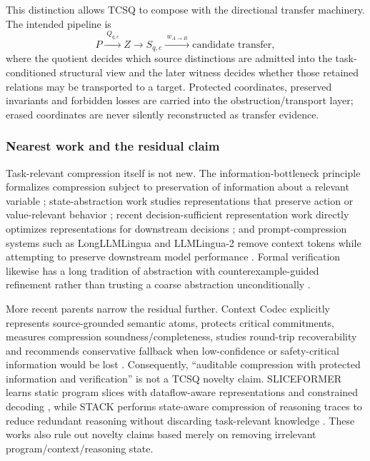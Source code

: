 This distinction allows TCSQ to compose with the directional transfer machinery. The intended pipeline is
\[
P\xrightarrow{\;Q_{q,c}\;}Z
\longrightarrow S_{q,c}
\xrightarrow{\;w_{A\to B}\;}
\text{candidate transfer},
\]
where the quotient decides which source distinctions are admitted into the task-conditioned structural view and the later witness decides whether those retained relations may be transported to a target. Protected coordinates, preserved invariants and forbidden losses are carried into the obstruction/transport layer; erased coordinates are never silently reconstructed as transfer evidence.

\subsubsection{Nearest work and the residual claim}
Task-relevant compression itself is not new. The information-bottleneck principle formalizes compression subject to preservation of information about a relevant variable \cite{tishby2000ib}; state-abstraction work studies representations that preserve action or value-relevant behavior \cite{huang2022actionsufficient,abel2020value}; recent decision-sufficient representation work directly optimizes representations for downstream decisions \cite{ye2026decision}; and prompt-compression systems such as LongLLMLingua and LLMLingua-2 remove context tokens while attempting to preserve downstream model performance \cite{jiang2024longllmlingua,pan2024llmlingua2}. Formal verification likewise has a long tradition of abstraction with counterexample-guided refinement rather than trusting a coarse abstraction unconditionally \cite{clarke2000cegar}.

More recent parents narrow the residual further. Context Codec explicitly represents source-grounded semantic atoms, protects critical commitments, measures compression soundness/completeness, studies round-trip recoverability and recommends conservative fallback when low-confidence or safety-critical information would be lost \cite{trukhina2026contextcodec}. Consequently, ``auditable compression with protected information and verification'' is not a TCSQ novelty claim. SLICEFORMER learns static program slices with dataflow-aware representations and constrained decoding \cite{he2026sliceformer}, while STACK performs state-aware compression of reasoning traces to reduce redundant reasoning without discarding task-relevant knowledge \cite{sui2026stack}. These works also rule out novelty claims based merely on removing irrelevant program/context/reasoning state.

